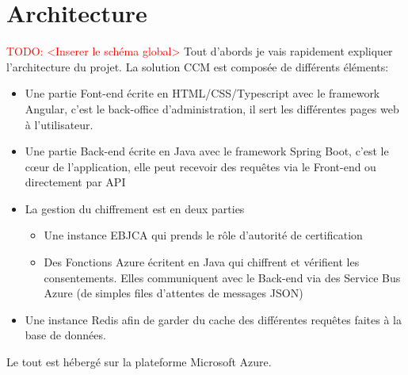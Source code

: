 \documentclass[12pt, a4paper]{report}
\makeatletter
\newcommand\TODO[1]{\textcolor{red}{TODO\@: #1}}
\makeatother
\begin{document}
        \section{Architecture}
            \TODO{<Inserer le schéma global>} \newline
            Tout d'abords je vais rapidement expliquer l'architecture du projet.
            La solution CCM est composée de différents éléments:
            \begin{itemize}
                \item Une partie Font-end écrite en HTML/CSS/Typescript avec le framework Angular, c'est le back-office d'administration, il sert les différentes pages web à l'utilisateur.
                \item Une partie Back-end écrite en Java avec le framework Spring Boot, c'est le cœur de l'application, elle peut recevoir des requêtes via le Front-end ou directement par API
                \item La gestion du chiffrement est en deux parties
                    \begin{itemize}
                        \item Une instance EBJCA qui prends le rôle d'autorité de certification
                        \item Des Fonctions Azure écritent en Java qui chiffrent et vérifient les consentements. Elles communiquent avec le Back-end via des Service Bus Azure (de simples files d'attentes de messages JSON)
                    \end{itemize}
                \item Une instance Redis afin de garder du cache des différentes requêtes faites à la base de données.
            \end{itemize}
            Le tout est hébergé sur la plateforme Microsoft Azure.
\end{document}
